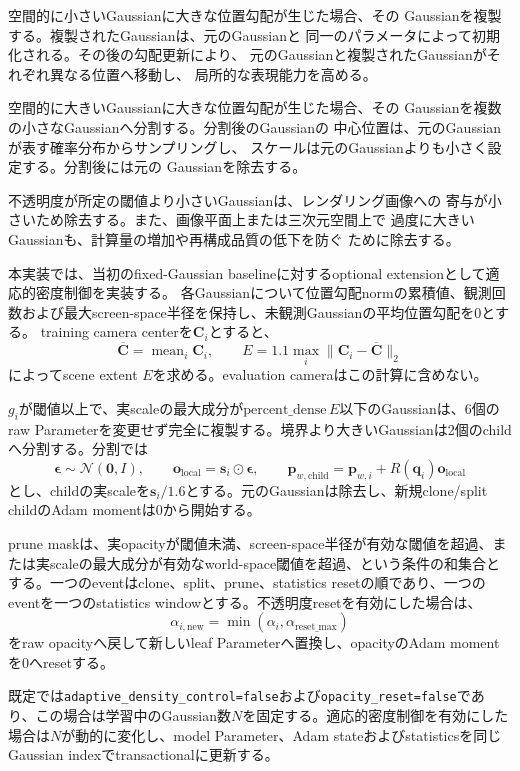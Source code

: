\documentclass[dvipdfmx]{jlreq}
\begin{document}
空間的に小さいGaussianに大きな位置勾配が生じた場合、その
Gaussianを複製する。複製されたGaussianは、元のGaussianと
同一のパラメータによって初期化される。その後の勾配更新により、
元のGaussianと複製されたGaussianがそれぞれ異なる位置へ移動し、
局所的な表現能力を高める。

空間的に大きいGaussianに大きな位置勾配が生じた場合、その
Gaussianを複数の小さなGaussianへ分割する。分割後のGaussianの
中心位置は、元のGaussianが表す確率分布からサンプリングし、
スケールは元のGaussianよりも小さく設定する。分割後には元の
Gaussianを除去する。

不透明度が所定の閾値より小さいGaussianは、レンダリング画像への
寄与が小さいため除去する。また、画像平面上または三次元空間上で
過度に大きいGaussianも、計算量の増加や再構成品質の低下を防ぐ
ために除去する。

本実装では、当初のfixed-Gaussian baselineに対するoptional extensionとして適応的密度制御を実装する。
各Gaussianについて位置勾配normの累積値、観測回数および最大screen-space半径を保持し、未観測Gaussianの平均位置勾配を$0$とする。
training camera centerを$\bm{C}_i$とすると、
\[
    \overline{\bm{C}}=\operatorname{mean}_i\bm{C}_i,\qquad
    E=1.1\max_i\lVert\bm{C}_i-\overline{\bm{C}}\rVert_2
\]
によってscene extent $E$を求める。evaluation cameraはこの計算に含めない。

$g_i$が閾値以上で、実scaleの最大成分が$\mathrm{percent\_dense}\,E$以下のGaussianは、6個のraw Parameterを変更せず完全に複製する。境界より大きいGaussianは2個のchildへ分割する。分割では
\[
    \bm{\epsilon}\sim\mathcal{N}(\bm{0},I),\qquad
    \bm{o}_{\mathrm{local}}=\bm{s}_i\odot\bm{\epsilon},\qquad
    \bm{p}_{w,\mathrm{child}}=\bm{p}_{w,i}+R(\bm{q}_i)\bm{o}_{\mathrm{local}}
\]
とし、childの実scaleを$\bm{s}_i/1.6$とする。元のGaussianは除去し、新規clone/split childのAdam momentは$0$から開始する。

prune maskは、実opacityが閾値未満、screen-space半径が有効な閾値を超過、または実scaleの最大成分が有効なworld-space閾値を超過、という条件の和集合とする。一つのeventはclone、split、prune、statistics resetの順であり、一つのeventを一つのstatistics windowとする。不透明度resetを有効にした場合は、
\[
    \alpha_{i,\mathrm{new}}=\min(\alpha_i,\alpha_{\mathrm{reset\_max}})
\]
をraw opacityへ戻して新しいleaf Parameterへ置換し、opacityのAdam momentを$0$へresetする。

既定では\texttt{adaptive\_density\_control=false}および\texttt{opacity\_reset=false}であり、この場合は学習中のGaussian数$N$を固定する。適応的密度制御を有効にした場合は$N$が動的に変化し、model Parameter、Adam stateおよびstatisticsを同じGaussian indexでtransactionalに更新する。
\end{document}
